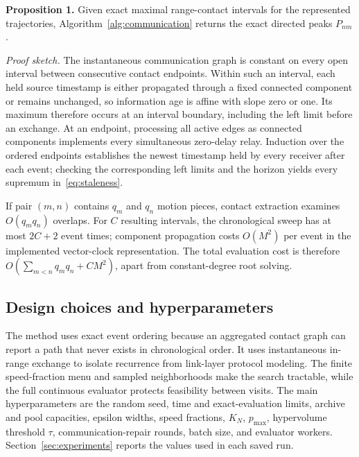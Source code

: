 \noindent\textbf{Proposition 1.} Given exact maximal range-contact intervals for the represented trajectories, Algorithm~\ref{alg:communication} returns the exact directed peaks $P_{nm}$.

\noindent\emph{Proof sketch.} The instantaneous communication graph is constant on every open interval between consecutive contact endpoints. Within such an interval, each held source timestamp is either propagated through a fixed connected component or remains unchanged, so information age is affine with slope zero or one. Its maximum therefore occurs at an interval boundary, including the left limit before an exchange. At an endpoint, processing all active edges as connected components implements every simultaneous zero-delay relay. Induction over the ordered endpoints establishes the newest timestamp held by every receiver after each event; checking the corresponding left limits and the horizon yields every supremum in~\eqref{eq:staleness}.

If pair $(m,n)$ contains $q_m$ and $q_n$ motion pieces, contact extraction examines $O(q_mq_n)$ overlaps. For $C$ resulting intervals, the chronological sweep has at most $2C+2$ event times; component propagation costs $O(M^2)$ per event in the implemented vector-clock representation. The total evaluation cost is therefore $O(\sum_{m<n}q_mq_n+CM^2)$, apart from constant-degree root solving.

\subsection{Design choices and hyperparameters}
The method uses exact event ordering because an aggregated contact graph can report a path that never exists in chronological order. It uses instantaneous in-range exchange to isolate recurrence from link-layer protocol modeling. The finite speed-fraction menu and sampled neighborhoods make the search tractable, while the full continuous evaluator protects feasibility between visits. The main hyperparameters are the random seed, time and exact-evaluation limits, archive and pool capacities, epsilon widths, speed fractions, $K_N$, $p_{\max}$, hypervolume threshold $\tau$, communication-repair rounds, batch size, and evaluator workers. Section~\ref{sec:experiments} reports the values used in each saved run.
